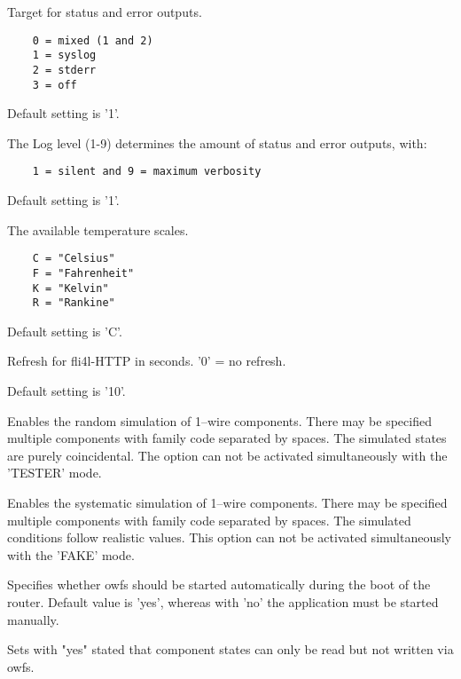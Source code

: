 \begin{description}
Target for status and error outputs.

\begin{verbatim}
    0 = mixed (1 and 2)
    1 = syslog
    2 = stderr
    3 = off
\end{verbatim}

Default setting is '1'.

 The Log level (1-9) determines the amount of status and error outputs, with:

\begin{verbatim}
    1 = silent and 9 = maximum verbosity
\end{verbatim}

Default setting is '1'.

 The available temperature scales.
\begin{verbatim}
    C = "Celsius"
    F = "Fahrenheit"
    K = "Kelvin"
    R = "Rankine"
\end{verbatim}

Default setting is 'C'.

 Refresh for fli4l-HTTP in seconds. '0' = no refresh.

 Default setting is '10'.

Enables the random simulation of 1--wire components.
There may be specified multiple components with family
code separated by spaces. The simulated states are purely
coincidental. The option can not be activated simultaneously
with the 'TESTER' mode.

Enables the systematic simulation of 1--wire components.
There may be specified multiple components with family
code separated by spaces. The simulated conditions follow
realistic values. This option can not be activated
simultaneously with the 'FAKE' mode.

Specifies whether owfs should be started automatically during
the boot of the router. Default value is 'yes', whereas
with 'no' the application must be started manually.

Sets with "yes" stated that component states can only be
read but not written via owfs.


\end{description}
